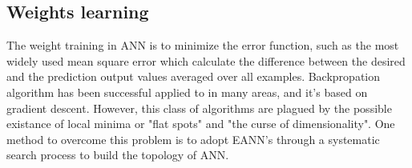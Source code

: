 \subsection{Weights learning}
The weight training in ANN is to minimize the error function, such as the most
widely used mean square error which calculate the difference  between the
desired and the prediction output values averaged over all examples.
Backpropation algorithm has been successful applied to in many areas, and it's
based on gradient descent. However, this class of algorithms are  plagued by
the possible existance of local minima or "flat spots" and "the curse of
dimensionality". One method to overcome this problem is to adopt
EANN's\cite{yao1999evolving} through a systematic search process\cite{elsken2019neural} to build
the topology of ANN.







